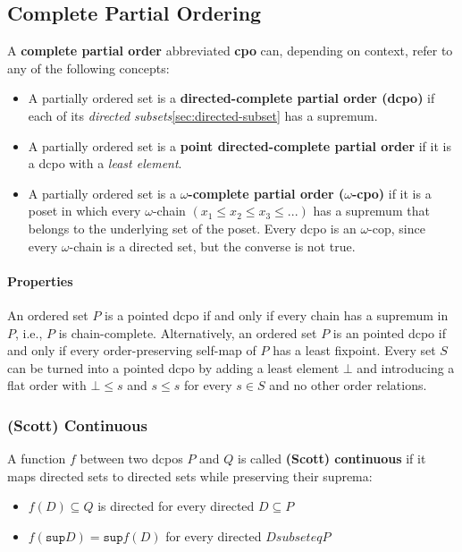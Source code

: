 \subsection{Complete Partial Ordering}
\label{sec:cpo}

A \textbf{complete partial order} abbreviated \textbf{cpo} can,
depending on context, refer to any of the following concepts:

\begin{itemize}
\item A partially ordered set is a \textbf{directed-complete partial
    order (dcpo)} if each of its \textit{directed
    subsets}\ref{sec:directed-subset} has a supremum.
\item A partially ordered set is a \textbf{point directed-complete
    partial order} if it is a dcpo with a \textit{least element}.
\item A partially ordered set is a \textbf{$\omega$-complete partial
    order ($\omega$-cpo)} if it is a poset in which every
  $\omega$-chain $(x_1 \leq x_2 \leq x_3 \leq ...)$ has a supremum
  that belongs to the underlying set of the poset. Every dcpo is an
  $\omega$-cop, since every $\omega$-chain is a directed set, but the
  converse is not true.
\end{itemize}


\paragraph{Properties}

An ordered set $P$ is a pointed dcpo if and only if every chain has a
supremum in $P$, i.e., $P$ is chain-complete. Alternatively, an
ordered set $P$ is an pointed dcpo if and only if every
order-preserving self-map of $P$ has a least fixpoint. Every set $S$
can be turned into a pointed dcpo by adding a least element $\bot$ and
introducing a flat order with $\bot \leq s$ and $s \leq s$ for every
$s \in S$ and no other order relations.


\subsubsection{(Scott) Continuous}
\label{sec:scott-continuous}

A function $f$ between two dcpos $P$ and $Q$ is called \textbf{(Scott)
  continuous} if it maps directed sets to directed sets while
preserving their suprema:

\begin{itemize}
\item $f(D) \subseteq Q$ is directed for every directed $D \subseteq P$
\item $f(\mathtt{sup}D) = \mathtt{sup} f(D)$ for every directed $D subseteq P$
\end{itemize}

